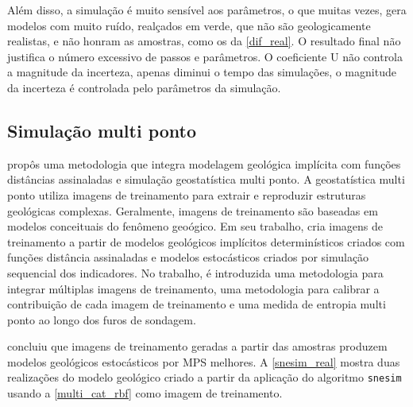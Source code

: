 Além disso, a simulação é muito sensível aos parâmetros, o que muitas vezes, gera modelos com muito ruído, realçados em verde, que não são geologicamente realistas, e não honram as amostras, como os da \autoref{dif_real}. O resultado final não justifica o número excessivo de passos e parâmetros. O coeficiente U não controla a magnitude da incerteza, apenas diminui o tempo das simulações, o magnitude da incerteza é controlada pelo parâmetros da simulação.

\subsection{Simulação multi ponto}

 propôs uma metodologia que integra modelagem geológica implícita com funções distâncias assinaladas e simulação geostatística multi ponto. A geostatística multi ponto utiliza imagens de treinamento para extrair e reproduzir estruturas geológicas complexas. Geralmente, imagens de treinamento são baseadas em modelos conceituais do fenômeno geoógico. Em seu trabalho,  cria imagens de treinamento a partir de modelos geológicos implícitos determinísticos criados com funções distância assinaladas e modelos estocásticos criados por simulação sequencial dos indicadores. No trabalho, é introduzida uma metodologia  para integrar múltiplas imagens de treinamento, uma metodologia para calibrar a contribuição de cada imagem de treinamento e uma medida de entropia multi ponto ao longo dos furos de sondagem.

 concluiu que imagens de treinamento geradas a partir das amostras produzem modelos geológicos estocásticos por MPS melhores. A \autoref{snesim_real} mostra duas realizações do modelo geológico criado a partir da aplicação do algoritmo \verb|snesim| \cite{strebelle2000sequential} usando a \autoref{multi_cat_rbf} como imagem de treinamento. 

